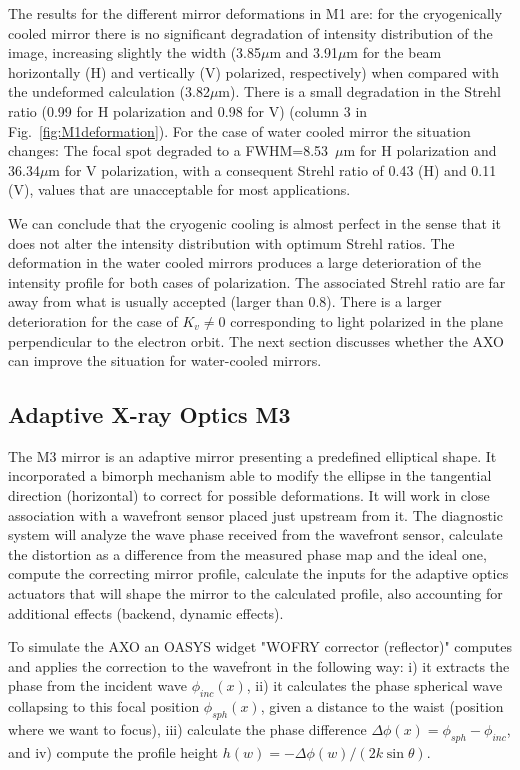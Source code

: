 \documentclass[preprint]{iucr}              %
\begin{document}
The results for the different mirror deformations in M1 are: for the cryogenically cooled mirror there is no significant degradation of intensity distribution of the image, increasing slightly the width (3.85$\mu$m and 3.91$\mu$m for the beam horizontally (H) and vertically (V) polarized, respectively) when compared with the undeformed calculation (3.82$\mu$m). There is a small degradation in the Strehl ratio (0.99 for H polarization and 0.98 for V) (column 3 in Fig.~\ref{fig:M1deformation}). For the case of water cooled mirror the situation changes: The focal spot degraded to a FWHM=8.53~$\mu$m for H polarization and 36.34$\mu$m for V polarization, with a consequent Strehl ratio of 0.43 (H) and 0.11 (V), values that are unacceptable for most applications. 

We can conclude that the cryogenic cooling is almost perfect in the sense that it does not alter the intensity distribution with optimum Strehl ratios. The deformation in the water cooled mirrors produces a large deterioration of the intensity profile for both cases of polarization. The associated Strehl ratio are far away from what is usually accepted (larger than 0.8). There is a larger deterioration for the case of $K_v\ne 0$ corresponding to light polarized in the plane perpendicular to the electron orbit. The next section discusses whether the AXO can improve the situation for water-cooled mirrors.    

\subsection{Adaptive X-ray Optics M3}

The M3 mirror is an adaptive mirror presenting a predefined elliptical shape. It incorporated a bimorph mechanism able to modify the ellipse in the tangential direction (horizontal) to correct for possible deformations. It will work in close association with a wavefront sensor placed just upstream from it. The diagnostic system will analyze the wave phase received from the wavefront sensor, calculate the distortion as a difference from the measured phase map and the ideal one, compute the correcting mirror profile, calculate the inputs for the adaptive optics actuators that will shape the mirror to the calculated profile, also accounting for additional effects (backend, dynamic effects).

To simulate the AXO an OASYS widget "WOFRY corrector (reflector)" computes and applies the correction to the wavefront in the following way: i) it extracts the phase from the incident wave $\phi_{inc}(x)$, ii)  it calculates the phase spherical wave collapsing to this focal position $\phi_{sph}(x)$, given a distance to the waist (position where we want to focus), iii) calculate the phase difference $\Delta \phi(x) = \phi_{sph} - \phi_{inc}$, and iv) compute the profile height $h(w) = -\Delta \phi(w) / (2 k \sin \theta)$.
\end{document}
